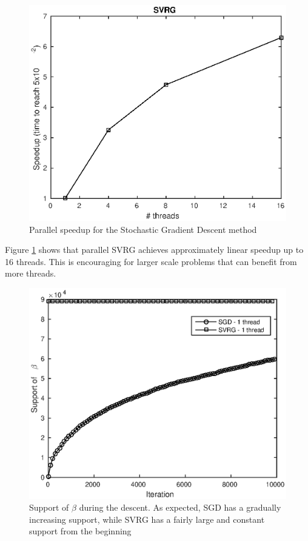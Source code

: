 \documentclass{article}
\begin{document}
\begin{figure}[!htbp]
	\centering
	\includegraphics[scale=0.5]{figs/svrg_speedup.eps}
	\caption{Parallel speedup for the Stochastic Gradient Descent method}
	\label{fig:svrg_speedup}
\end{figure}

Figure \ref{fig:svrg_speedup} shows that parallel SVRG achieves approximately linear speedup up to 16 threads. This is encouraging for larger scale problems that can benefit from more threads. 


\begin{figure}[!htbp]
	\centering
	\includegraphics[scale=0.5]{figs/sup_beta.eps}
	\caption{Support of $\beta$ during the descent. As expected, SGD has a gradually increasing support, while SVRG has a fairly large and constant support from the beginning}
	\label{fig:support_beta}
\end{figure}
\end{document}
